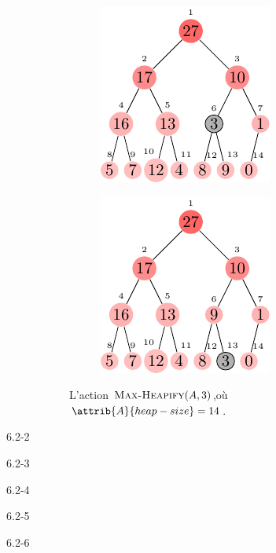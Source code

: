 \begin{description}
\begin{ex}
\begin{figure}[H]
        \begin{subfigure}[t]{.45\textwidth}
          \centering
          \includegraphics[scale=1.4]{img/6_2-1/6_2-1_2}
          \caption{}\label{fig:6_2-1_2}
        \end{subfigure}
        \begin{subfigure}[t]{.45\textwidth}
          \centering
          \includegraphics[scale=1.4]{img/6_2-1/6_2-1_3}
          \caption{}\label{fig:6_2-1_3}
        \end{subfigure}
        \caption{L'action $\textsc{Max-Heapify}(A,3)$,o\`u $\attrib{A}{heap-size}= 14$.} 
        \label{fig:Heapify}
      \end{figure}
    \end{ex}
  \item[6.2-2] {\itshape }
    \begin{exrev}
      
    \end{exrev}
  \item[6.2-3] {\itshape }
    \begin{exrev}
      
    \end{exrev}
  \item[6.2-4] {\itshape }
    \begin{exrev}
      
    \end{exrev}
  \item[6.2-5] {\itshape }
    \begin{exrev}
      
    \end{exrev}
  \item[6.2-6] {\itshape }
    \begin{exrev}
      
    \end{exrev}
\end{description}
